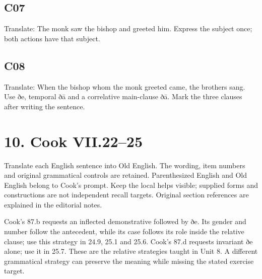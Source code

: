 \par\begin{minipage}{\linewidth}\raggedright
\subsection*{C07}

Translate: The monk saw the bishop and greeted him. Express the subject once; both actions have that subject.

\end{minipage}\par\addvspace{4pt}

\par\begin{minipage}{\linewidth}\raggedright
\subsection*{C08}

Translate: When the bishop whom the monk greeted came, the brothers sang. Use ðe, temporal ðā and a correlative main-clause ðā. Mark the three clauses after writing the sentence.

\end{minipage}\par\addvspace{4pt}

\section*{10. Cook VII.22–25}

Translate each English sentence into Old English. The wording, item numbers and original grammatical controls are retained. Parenthesized English and Old English belong to Cook’s prompt. Keep the local helps visible; supplied forms and constructions are not independent recall targets. Original section references are explained in the editorial notes.

Cook’s 87.b requests an inflected demonstrative followed by ðe. Its gender and number follow the antecedent, while its case follows its role inside the relative clause; use this strategy in 24.9, 25.1 and 25.6. Cook’s 87.d requests invariant ðe alone; use it in 25.7. These are the relative strategies taught in Unit 8. A different grammatical strategy can preserve the meaning while missing the stated exercise target.

